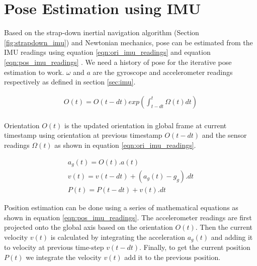 \section{Pose Estimation using IMU}
Based on the strap-down inertial navigation algorithm (Section \ref{fig:strapdown_imu}) and Newtonian mechanics, pose can be estimated from the IMU readings using equation \ref{eqn:ori_imu_readings} and equation \ref{eqn:pos_imu_readings} \citep{rao2022ctin}. We need a history of pose for the iterative pose estimation to work. $ \omega $ and $ a $ are the gyroscope and accelerometer readings respectively as defined in section \ref{sec:imu}.

\begin{equation}
  \label{eqn:ori_imu_readings}
  \begin{aligned}
    O(t) = O(t - dt) exp(\int_{t-dt}^{t} \Omega(t) dt) \\
  \end{aligned}
\end{equation}

 Orientation $ O(t) $ is the updated orientation in global frame at current timestamp using orientation at previous timestamp $ O(t - dt) $  and the sensor readings $ \Omega(t) $ as shown in equation \ref{eqn:ori_imu_readings}.

\begin{equation}
  \label{eqn:pos_imu_readings}
  \begin{gathered}
    a_g(t) = O(t).a(t) \\
    v(t) = v(t-dt) + (a_g(t) - g_g).dt \\
    P(t) = P(t-dt) + v(t).dt
  \end{gathered}
\end{equation}

 Position estimation can be done using a series of mathematical equations as shown in equation \ref{eqn:pos_imu_readings}. The accelerometer readings are first projected onto the global axis based on the orientation $ O(t) $. Then the current velocity $ v(t) $ is calculated by integrating the acceleration $ a_g(t) $ and adding it to velocity at previous time-step $ v(t-dt) $. Finally, to get the current position $ P(t) $ we integrate the velocity $ v(t) $ add it to the previous position. 

